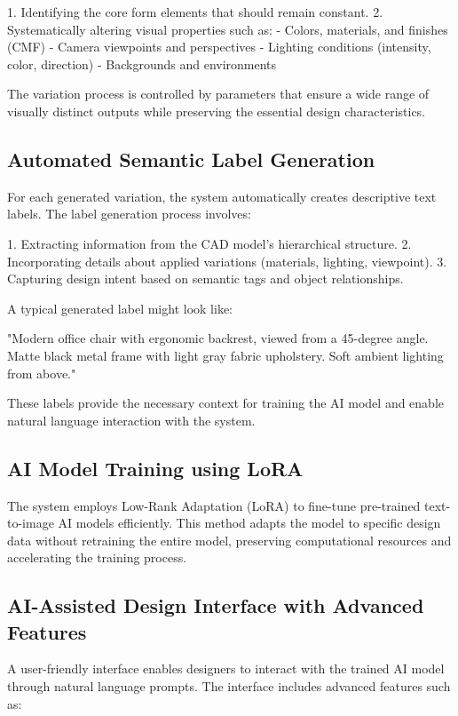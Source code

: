 \documentclass{article}
\begin{document}
1. Identifying the core form elements that should remain constant.
2. Systematically altering visual properties such as:
   - Colors, materials, and finishes (CMF)
   - Camera viewpoints and perspectives
   - Lighting conditions (intensity, color, direction)
   - Backgrounds and environments

The variation process is controlled by parameters that ensure a wide range of visually distinct outputs while preserving the essential design characteristics.

\subsection{Automated Semantic Label Generation}

For each generated variation, the system automatically creates descriptive text labels. The label generation process involves:

1. Extracting information from the CAD model's hierarchical structure.
2. Incorporating details about applied variations (materials, lighting, viewpoint).
3. Capturing design intent based on semantic tags and object relationships.

A typical generated label might look like:

"Modern office chair with ergonomic backrest, viewed from a 45-degree angle. Matte black metal frame with light gray fabric upholstery. Soft ambient lighting from above."

These labels provide the necessary context for training the AI model and enable natural language interaction with the system.

\subsection{AI Model Training using LoRA}

The system employs Low-Rank Adaptation (LoRA) to fine-tune pre-trained text-to-image AI models efficiently. This method adapts the model to specific design data without retraining the entire model, preserving computational resources and accelerating the training process.

\subsection{AI-Assisted Design Interface with Advanced Features}

A user-friendly interface enables designers to interact with the trained AI model through natural language prompts. The interface includes advanced features such as:
\end{document}
